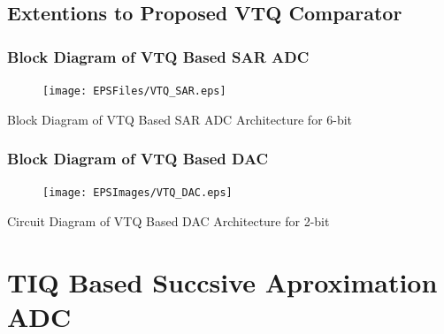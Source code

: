 \subsection*{Extentions to Proposed VTQ Comparator}
\begin{frame}
	\frametitle{Block Diagram of VTQ Based SAR ADC}
	\begin{center}
		\begin{figure}
		\texttt{[image: EPSFiles/VTQ\_SAR.eps]}\\
		\end{figure}
	\small{Block Diagram of VTQ Based SAR ADC Architecture for 6-bit}
	\end{center}
\end{frame}
\begin{frame}
	\frametitle{Block Diagram of VTQ Based DAC}
	\begin{center}
		\begin{figure}
		\texttt{[image: EPSImages/VTQ\_DAC.eps]}\\
		\end{figure}
	\small{Circuit Diagram of VTQ Based DAC Architecture for  2-bit}
	\end{center}
\end{frame}
\section{TIQ Based Succsive Aproximation ADC}
